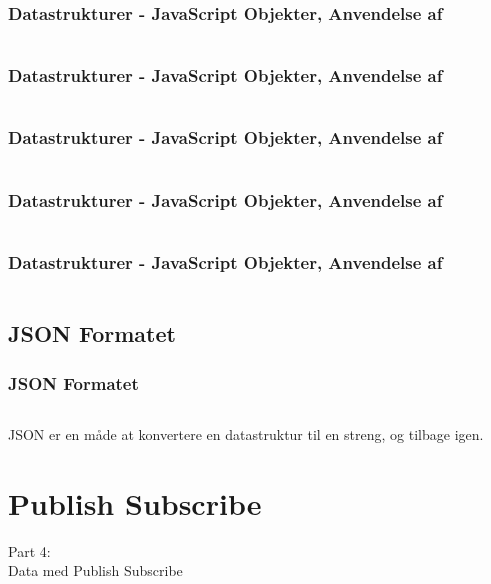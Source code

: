 \begin{frame}
    \frametitle{Datastrukturer - JavaScript Objekter, Anvendelse af}
    \vspace{-1mm}
    \inputminted[fontsize=\footnotesize]{javascript}{../src/frontend/part3_object/logic.js}
\end{frame}
\begin{frame}
    \frametitle{Datastrukturer - JavaScript Objekter, Anvendelse af}
    \vspace{-1mm}
    \inputminted[fontsize=\footnotesize,highlightlines={1}]{javascript}{../src/frontend/part3_object/logic.js}
\end{frame}
\begin{frame}
    \frametitle{Datastrukturer - JavaScript Objekter, Anvendelse af}
    \vspace{-1mm}
    \inputminted[fontsize=\footnotesize,highlightlines={4,8}]{javascript}{../src/frontend/part3_object/logic.js}
\end{frame}
\begin{frame}
    \frametitle{Datastrukturer - JavaScript Objekter, Anvendelse af}
    \vspace{-1mm}
    \inputminted[fontsize=\footnotesize,highlightlines={9}]{javascript}{../src/frontend/part3_object/logic.js}
\end{frame}
\begin{frame}
    \frametitle{Datastrukturer - JavaScript Objekter, Anvendelse af}
    \vspace{-1mm}
    \inputminted[fontsize=\footnotesize]{javascript}{../src/frontend/part3_object/logic.js}
\end{frame}

\subsection{JSON Formatet}
\begin{frame}
    \frametitle{JSON Formatet}
    \vspace{-1mm}
    \inputminted[fontsize=\footnotesize,highlightlines={1}]{javascript}{../src/frontend/part3_json/logic.js}
    
    \pause
    \vspace{1mm}
    JSON er en måde at konvertere en datastruktur til en streng, og tilbage igen.
\end{frame}

\section{Publish Subscribe}
\begin{frame}
    \vspace{25mm}
    \begin{center}
        \Huge{Part 4:\\Data med Publish Subscribe}
    \end{center}
\end{frame}

